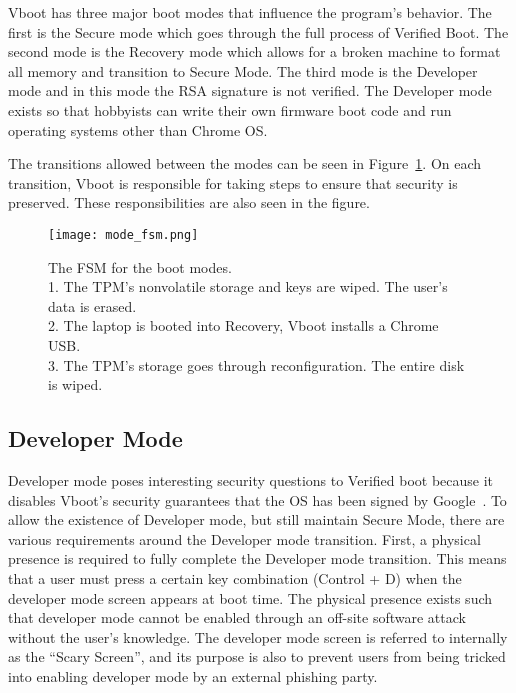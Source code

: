 Vboot has three major boot modes that influence the program's behavior.
The first is the Secure mode which goes through the full process of Verified Boot.
The second mode is the Recovery mode which allows for a broken machine to
format all memory and transition to Secure Mode.
The third mode is the Developer mode and in this mode the RSA signature is not verified.
The Developer mode exists so that hobbyists can write their own firmware boot code and run operating systems other than Chrome OS\@.

The transitions allowed between the modes can be seen in
Figure~\ref{fig:mode_fsm}.
On each transition, Vboot is responsible for taking steps to ensure that
security is preserved. 
These responsibilities are also seen in the figure.

\begin{figure}
  \centering
  \texttt{[image: mode\_fsm.png]}
  \caption[Vboot Boot Mode FSM]{The FSM for the boot modes. \\
  1. The TPM's nonvolatile storage and keys are wiped. The user's data
  is erased. \\
  2. The laptop is booted into Recovery, Vboot installs a Chrome USB.
  \\
  3. The TPM's storage goes through reconfiguration. The entire disk is wiped.
  \\}\label{fig:mode_fsm}
\end{figure}

\subsection{Developer Mode}

Developer mode poses interesting security questions to Verified boot because it
disables Vboot's security guarantees that the OS has been signed by Google~\cite{developer-mode}. 
To allow the existence of Developer mode, but still maintain 
Secure Mode, there are various requirements around the Developer mode transition.
First, a physical presence is required to fully complete the Developer mode transition. 
This means that a user must press a certain key combination (Control + D) when
the developer mode screen appears at boot time.
The physical presence exists such that developer mode cannot be enabled through an off-site software attack without the user's knowledge.
The developer mode screen is referred to internally as the ``Scary Screen'', and its purpose is also to prevent users from being tricked into enabling developer mode by an external phishing party.

